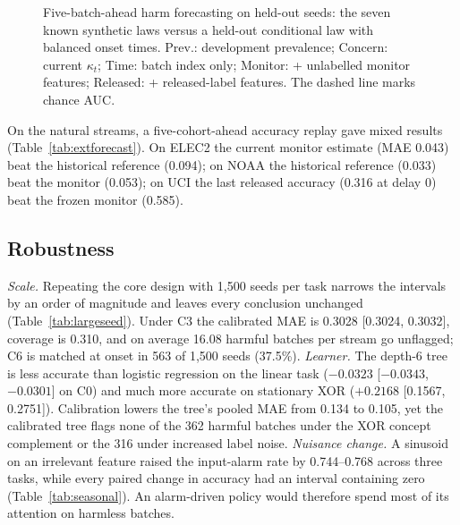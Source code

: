 \begin{figure}[t]
\centering
\resizebox{\columnwidth}{!}{}
\caption{Five-batch-ahead harm forecasting on held-out seeds: the seven known synthetic laws versus a held-out conditional law with balanced onset times. Prev.: development prevalence; Concern: current $\kappa_t$; Time: batch index only; Monitor: + unlabelled monitor features; Released: + released-label features. The dashed line marks chance AUC.}
\label{fig:forecast}
\end{figure}

On the natural streams, a five-cohort-ahead accuracy replay gave mixed results
(Table~\ref{tab:extforecast}). On ELEC2 the current monitor estimate (MAE 0.043) beat
the historical reference (0.094); on NOAA the historical reference (0.033) beat the
monitor (0.053); on UCI the last released accuracy (0.316 at delay 0) beat the frozen
monitor (0.585).

\subsection{Robustness}
\label{sec:res-robust}
\emph{Scale.} Repeating the core design with 1,500 seeds per task narrows the
intervals by an order of magnitude and leaves every conclusion unchanged
(Table~\ref{tab:largeseed}). Under C3 the calibrated MAE is 0.3028 [0.3024, 0.3032],
coverage is 0.310, and on average 16.08 harmful batches per stream go unflagged; C6
is matched at onset in 563 of 1,500 seeds (37.5\%). \emph{Learner.} The depth-6 tree
is less accurate than logistic regression on the linear task ($-0.0323$
[$-0.0343$, $-0.0301$] on C0) and much more accurate on stationary XOR ($+0.2168$
[0.1567, 0.2751]). Calibration lowers the tree's pooled MAE from 0.134 to 0.105, yet
the calibrated tree flags none of the 362 harmful batches under the XOR concept
complement or the 316 under increased label noise. \emph{Nuisance change.} A sinusoid
on an irrelevant feature raised the input-alarm rate by 0.744--0.768 across three
tasks, while every paired change in accuracy had an interval containing zero
(Table~\ref{tab:seasonal}). An alarm-driven policy would therefore spend most of its
attention on harmless batches.
